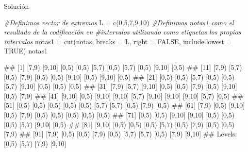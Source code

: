 \documentclass[
  ignorenonframetext,
  aspectratio=169]{beamer}
\newenvironment{Shaded}{\begin{snugshade}}{\end{snugshade}}
\newcommand{\AttributeTok}[1]{\textcolor[rgb]{0.77,0.63,0.00}{#1}}
\newcommand{\CommentTok}[1]{\textcolor[rgb]{0.56,0.35,0.01}{\textit{#1}}}
\newcommand{\ConstantTok}[1]{\textcolor[rgb]{0.00,0.00,0.00}{#1}}
\newcommand{\DecValTok}[1]{\textcolor[rgb]{0.00,0.00,0.81}{#1}}
\newcommand{\FunctionTok}[1]{\textcolor[rgb]{0.00,0.00,0.00}{#1}}
\newcommand{\NormalTok}[1]{#1}
\newcommand{\OtherTok}[1]{\textcolor[rgb]{0.56,0.35,0.01}{#1}}
\let\oldverbatim\verbatim
\let\endoldverbatim\endverbatim
\renewenvironment{verbatim}{\tiny\oldverbatim}{\endoldverbatim}
\begin{document}
\begin{frame}[fragile]{Solución}
\protect\hypertarget{soluciuxf3n-17}{}
\begin{Shaded}
\begin{Highlighting}[]
\CommentTok{\#Definimos vector de extremos}
\NormalTok{L }\OtherTok{=} \FunctionTok{c}\NormalTok{(}\DecValTok{0}\NormalTok{,}\DecValTok{5}\NormalTok{,}\DecValTok{7}\NormalTok{,}\DecValTok{9}\NormalTok{,}\DecValTok{10}\NormalTok{)}
\CommentTok{\#Definimos notas1 como el resultado de la codificación en }
\CommentTok{\#intervalos utilizando como etiquetas los propios intervalos}
\NormalTok{notas1 }\OtherTok{=} \FunctionTok{cut}\NormalTok{(notas, }\AttributeTok{breaks =}\NormalTok{ L, }\AttributeTok{right =} \ConstantTok{FALSE}\NormalTok{, }\AttributeTok{include.lowest =} \ConstantTok{TRUE}\NormalTok{)}
\NormalTok{notas1}
\end{Highlighting}
\end{Shaded}

\begin{verbatim}
##   [1] [7,9)  [9,10] [0,5)  [0,5)  [5,7)  [0,5)  [5,7)  [0,5)  [9,10] [0,5) 
##  [11] [7,9)  [5,7)  [0,5)  [7,9)  [0,5)  [0,5)  [9,10] [0,5)  [9,10] [0,5) 
##  [21] [0,5)  [0,5)  [5,7)  [0,5)  [0,5)  [5,7)  [9,10] [0,5)  [0,5)  [0,5) 
##  [31] [7,9)  [5,7)  [9,10] [0,5)  [0,5)  [7,9)  [0,5)  [9,10] [0,5)  [7,9) 
##  [41] [9,10] [0,5)  [9,10] [9,10] [5,7)  [9,10] [9,10] [9,10] [5,7)  [0,5) 
##  [51] [0,5)  [0,5)  [0,5)  [0,5)  [0,5)  [5,7)  [5,7)  [0,5)  [7,9)  [0,5) 
##  [61] [7,9)  [0,5)  [9,10] [0,5)  [7,9)  [0,5)  [0,5)  [0,5)  [0,5)  [0,5) 
##  [71] [0,5)  [0,5)  [9,10] [9,10] [0,5)  [0,5)  [0,5)  [5,7)  [9,10] [0,5) 
##  [81] [9,10] [0,5)  [0,5)  [0,5)  [5,7)  [0,5)  [7,9)  [0,5)  [0,5)  [7,9) 
##  [91] [7,9)  [0,5)  [0,5)  [7,9)  [0,5)  [5,7)  [5,7)  [0,5)  [7,9)  [9,10]
## Levels: [0,5) [5,7) [7,9) [9,10]
\end{verbatim}
\end{frame}
\end{document}
